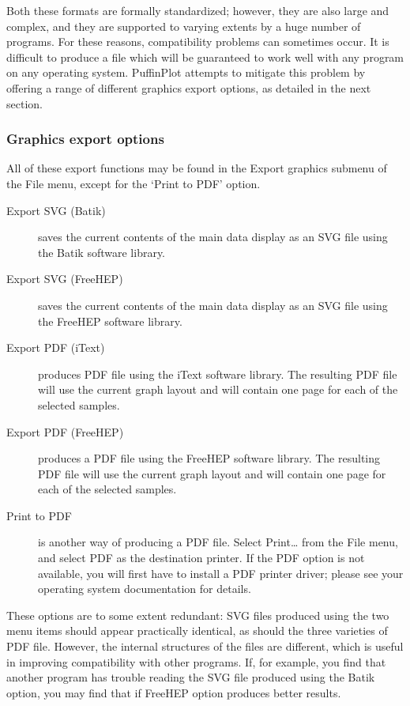\documentclass[a4paper,british]{article}
\newcommand{\ppcmd}[1]{\textsf{#1}} %
\newcommand{\caps}[1]{\MakeTextUppercase{#1}} %
\begin{document}
Both these formats are formally standardized; however, they are also large
and complex, and they are supported to varying extents by a huge number of
programs. For these reasons, compatibility problems can sometimes occur. It
is difficult to produce a file which will be guaranteed to work well with any
program on any operating system. PuffinPlot attempts to mitigate this problem
by offering a range of different graphics export options, as detailed in the
next section.

\subsubsection{Graphics export options}

All of these export functions may be found in the \ppcmd{Export graphics}
submenu of the \ppcmd{File} menu, except for the ‘Print to PDF’ option.

\begin{description}

\item[Export SVG (Batik)] saves the current contents of the main
  data display as an \caps{svg} file using the Batik software
  library.

\item[Export SVG (FreeHEP)] saves the current contents of the main
  data display as an \caps{svg} file using the FreeHEP software
  library.

\item[Export PDF (iText)] produces \caps{pdf} file using the iText software
  library. The resulting \caps{pdf} file will use the current graph layout
  and will contain one page for each of the selected samples.

\item[Export PDF (FreeHEP)] produces a \caps{pdf} file using the FreeHEP
  software library. The resulting \caps{pdf} file will use the current graph
  layout and will contain one page for each of the selected samples.

\item[Print to PDF] is another way of producing a PDF file. Select
  \ppcmd{Print\ldots} from the \ppcmd{File} menu, and select \ppcmd{PDF} as
  the destination printer. If the PDF option is not available, you will
  first have to install a PDF printer driver; please see your operating
  system documentation for details.

\end{description}

These options are to some extent redundant: SVG files produced using the two
menu items should appear practically identical, as should the three varieties
of PDF file. However, the internal structures of the files are different,
which is useful in improving compatibility with other programs. If, for
example, you find that another program has trouble reading the SVG file
produced using the Batik option, you may find that if FreeHEP option 
produces better results.
\end{document}
